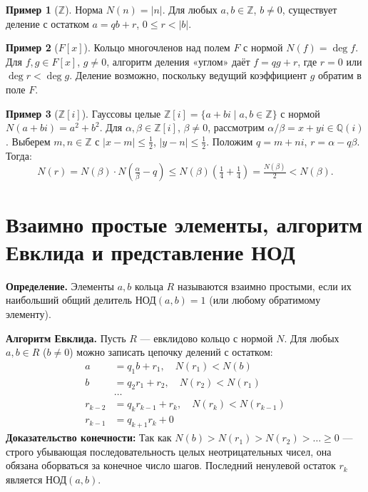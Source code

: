 \documentclass[12pt, a4paper]{article}
\theoremstyle{definition}
\newtheorem{example}{Пример}
\theoremstyle{remark}
\newcommand{\Z}{\mathbb{Z}}
\newcommand{\Q}{\mathbb{Q}}
\begin{document}
\begin{example}[$\Z$]
	Норма $N(n) = |n|$. Для любых $a, b \in \Z$, $b \neq 0$, существует деление с остатком $a = qb + r$, $0 \leq r < |b|$.
\end{example}

\begin{example}[${F[x]}$]
	Кольцо многочленов над полем $F$ с нормой $N(f) = \deg f$. Для $f, g \in F[x]$,
	$g \neq 0$, алгоритм деления «углом» даёт $f = qg + r$, где $r = 0$ или
	$\deg r < \deg g$. Деление возможно, поскольку ведущий коэффициент $g$
	обратим в поле $F$.
\end{example}

\begin{example}[{$\Z[i]$}]
	Гауссовы целые $\Z[i] = \{a + bi \mid a, b \in \Z\}$ с нормой $N(a+bi) = a^2 + b^2$.
	Для $\alpha, \beta \in \Z[i]$, $\beta \neq 0$, рассмотрим $\alpha/\beta = x + yi \in \Q(i)$.
	Выберем $m, n \in \Z$ с $|x - m| \leq \tfrac{1}{2}$, $|y - n| \leq \tfrac{1}{2}$.
	Положим $q = m + ni$, $r = \alpha - q\beta$. Тогда:
	\[
	N(r) = N(\beta) \cdot N\!\left(\tfrac{\alpha}{\beta} - q\right)
	\leq N(\beta)\!\left(\tfrac{1}{4} + \tfrac{1}{4}\right)
	= \tfrac{N(\beta)}{2} < N(\beta).
	\]
\end{example}

\section{Взаимно простые элементы, алгоритм Евклида и представление НОД}

\textbf{Определение.} Элементы $a, b$ кольца $R$ называются взаимно простыми, если их наибольший общий делитель $\text{НОД}(a, b) = 1$ (или любому обратимому элементу).

\textbf{Алгоритм Евклида.} Пусть $R$ — евклидово кольцо с нормой $N$. Для любых $a, b \in R$ ($b \neq 0$) можно записать цепочку делений с остатком:
\begin{align*}
	a &= q_1 b + r_1, \quad N(r_1) < N(b) \\
	b &= q_2 r_1 + r_2, \quad N(r_2) < N(r_1) \\
	&\dots \\
	r_{k-2} &= q_k r_{k-1} + r_k, \quad N(r_k) < N(r_{k-1}) \\
	r_{k-1} &= q_{k+1} r_k + 0
\end{align*}
\textbf{Доказательство конечности:} Так как $N(b) > N(r_1) > N(r_2) > \dots \geq 0$ — строго убывающая последовательность целых неотрицательных чисел, она обязана оборваться за конечное число шагов. Последний ненулевой остаток $r_k$ является $\text{НОД}(a, b)$.
\end{document}
